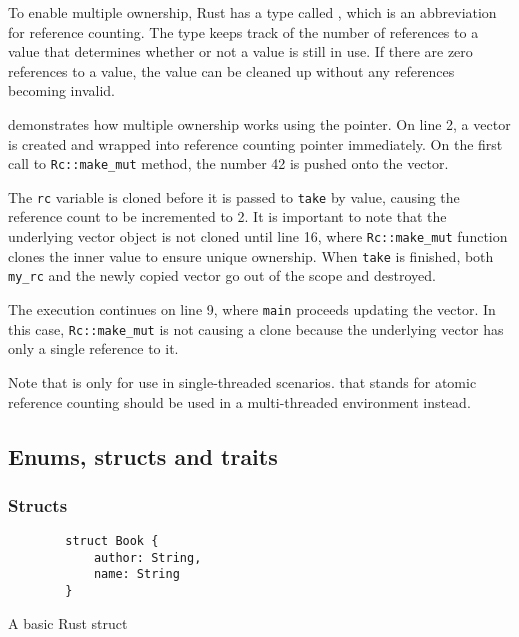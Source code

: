 To enable multiple ownership, Rust has a type called , which is an abbreviation for reference counting. The  type keeps track of the number of references to a value that determines whether or not a value is still in use. If there are zero references to a value, the value can be cleaned up without any references becoming invalid.

 demonstrates how multiple ownership works using the  pointer. On line 2, a vector is created and wrapped into reference counting pointer immediately. On the first call to \texttt{Rc::make_mut} method, the number 42 is pushed onto the vector.

The \texttt{rc} variable is cloned before it is passed to \texttt{take} by value, causing the reference count to be incremented to 2. It is important to note that the underlying vector object is not cloned until line 16, where \texttt{Rc::make_mut} function clones the inner value to ensure unique ownership. When \texttt{take} is finished, both \texttt{my_rc} and the newly copied vector go out of the scope and destroyed.

The execution continues on line 9, where \texttt{main} proceeds updating the vector. In this case, \texttt{Rc::make_mut} is not causing a clone because the underlying vector has only a single reference to it.

Note that  is only for use in single-threaded scenarios.  that stands for atomic reference counting should be used in a multi-threaded environment instead.

\subsection{Enums, structs and traits}
\label{sec:enums-structs-traits}

\subsubsection*{Structs}

\begin{listing}[!htbp]

    \centering
    \begin{verbatim}
        struct Book {
            author: String,
            name: String
        }
    \end{verbatim}

    \caption{A basic Rust struct}
    \label{lst:struct}
\end{listing}


